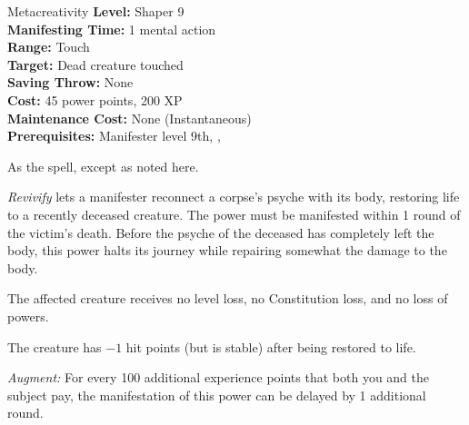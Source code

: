 {Metacreativity}
{
	\textbf{Level:}
	Shaper 9\\
	\textbf{Manifesting Time:}
	1 mental action\\
	\textbf{Range:}
	Touch\\
	\textbf{Target:}
	Dead creature touched\\
	\textbf{Saving Throw:}
	None\\
	\textbf{Cost:}
	45 power points, 200 XP\\
	\textbf{Maintenance Cost:}
	None (Instantaneous)\\
	\textbf{Prerequisites:}
	Manifester level 9th, , \\
}
{
	As the  spell, except as noted here.

	\emph{Revivify} lets a manifester reconnect a corpse's psyche with its body, restoring life to a recently deceased creature. The power must be manifested within 1 round of the victim's death. Before the psyche of the deceased has completely left the body, this power halts its journey while repairing somewhat the damage to the body.

	The affected creature receives no level loss, no Constitution loss, and no loss of powers.

	The creature has $-1$ hit points (but is stable) after being restored to life.

	\textit{Augment:} For every 100 additional experience points that both you and the subject pay, the manifestation of this power can be delayed by 1 additional round.
}
